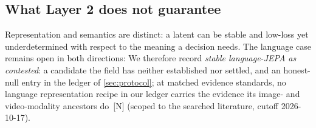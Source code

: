 \subsection{What Layer 2 does not guarantee}
\label{sec:l2-limits}

 Representation and
semantics are distinct: a latent can be stable and low-loss yet underdetermined with
respect to the meaning a decision needs. The language case remains open in both directions:
 We therefore record \emph{stable language-JEPA as contested}: a
candidate the field has neither established nor settled, and an honest-null entry in the ledger
of \cref{sec:protocol}; at matched evidence standards, no language representation recipe in our
ledger carries the evidence its image- and video-modality ancestors do~\textsf{[N]} (scoped to the
searched literature, cutoff 2026-10-17).
